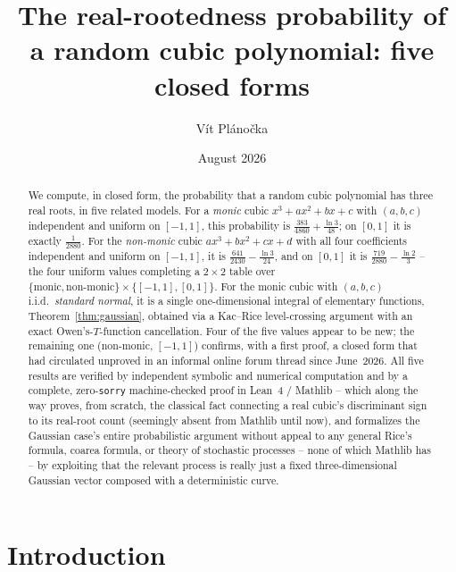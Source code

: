 \documentclass[11pt,reqno]{amsart}
\title[Real-rootedness of a random cubic]{The real-rootedness probability of a random cubic polynomial: five closed forms}
\author{Vít Plánočka}
\date{August 2026}
\theoremstyle{plain}
\theoremstyle{remark}
\begin{document}
\begin{abstract}
We compute, in closed form, the probability that a random cubic polynomial
has three real roots, in five related models. For a \emph{monic} cubic
$x^3+ax^2+bx+c$ with $(a,b,c)$ independent and uniform on $[-1,1]$, this
probability is $\tfrac{383}{4860}+\tfrac{\ln 3}{48}$; on $[0,1]$ it is exactly
$\tfrac{1}{2880}$. For the \emph{non-monic} cubic $ax^3+bx^2+cx+d$ with all
four coefficients independent and uniform on $[-1,1]$, it is
$\tfrac{641}{2430}-\tfrac{\ln 3}{24}$, and on $[0,1]$ it is
$\tfrac{719}{2880}-\tfrac{\ln 2}{3}$ -- the four uniform values completing a
$2\times2$ table over $\{\text{monic},\text{non-monic}\}\times\{[-1,1],[0,1]\}$.
For the monic cubic with $(a,b,c)$ i.i.d.\ \emph{standard normal}, it is a
single one-dimensional integral of elementary functions,
Theorem~\ref{thm:gaussian}, obtained via a Kac--Rice level-crossing argument
with an exact Owen's-$T$-function cancellation. Four of the five values
appear to be new; the remaining one (non-monic, $[-1,1]$) confirms, with a
first proof, a closed form that had circulated unproved in an informal online
forum thread since June~2026. All five results are verified by independent
symbolic and numerical computation and by a complete, zero-\texttt{sorry}
machine-checked proof in Lean~4 / Mathlib -- which along the way proves, from
scratch, the classical fact connecting a real cubic's discriminant sign to
its real-root count (seemingly absent from Mathlib until now), and formalizes
the Gaussian case's entire probabilistic argument without appeal to any
general Rice's formula, coarea formula, or theory of stochastic processes --
none of which Mathlib has -- by exploiting that the relevant process is
really just a fixed three-dimensional Gaussian vector composed with a
deterministic curve.
\end{abstract}

\maketitle

\tableofcontents

\section{Introduction}
\end{document}
